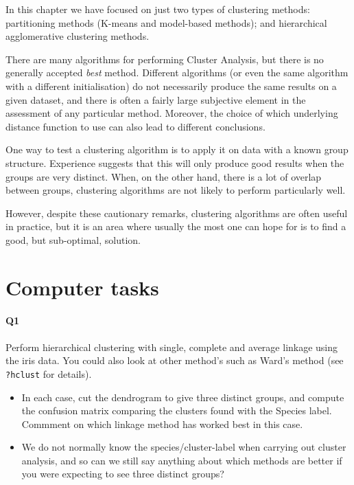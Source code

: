 \documentclass[
]{book}
\providecommand{\tightlist}{%
  \setlength{\itemsep}{0pt}\setlength{\parskip}{0pt}}
\theoremstyle{definition}
\theoremstyle{definition}
\theoremstyle{definition}
\theoremstyle{definition}
\theoremstyle{remark}
\begin{document}
In this chapter we have focused on just two types of clustering methods: partitioning methods (K-means and model-based methods); and hierarchical agglomerative clustering methods.

There are many algorithms for performing Cluster Analysis, but there is no generally accepted \emph{best} method. Different algorithms (or even the same algorithm with a different initialisation) do not necessarily produce the same results on a given dataset, and there is often a fairly large subjective element in the assessment of any particular method. Moreover, the choice of which underlying distance function to use can also lead to different conclusions.

One way to test a clustering algorithm is to apply it on data with a known group structure. Experience suggests that this will only produce good results when the groups are very distinct. When, on the other hand, there is a lot of overlap between groups, clustering algorithms are not likely to perform particularly well.

However, despite these cautionary remarks, clustering algorithms are often useful in practice, but it is an area where usually the most one can hope for is to find a good, but sub-optimal, solution.

\hypertarget{computer-tasks-5}{%
\section{Computer tasks}\label{computer-tasks-5}}

\hypertarget{q1}{%
\paragraph*{Q1}\label{q1}}

Perform hierarchical clustering with single, complete and average linkage using the iris data. You could also look
at other method's such as Ward's method (see \texttt{?hclust} for details).

\begin{itemize}
\tightlist
\item
  In each case, cut the dendrogram to give three distinct groups, and compute the confusion matrix comparing the clusters found with the Species label.
  Commment on which linkage method has worked best in this case.
\end{itemize}

\begin{itemize}
\tightlist
\item
  We do not normally know the species/cluster-label when carrying out cluster analysis, and so can we still say anything about which methods are better if you were expecting to see three distinct groups?
\end{itemize}
\end{document}
